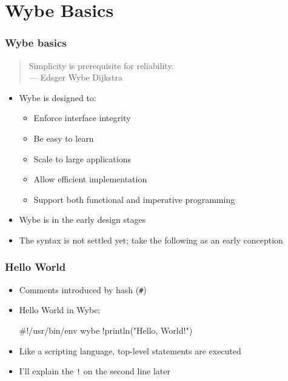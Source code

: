 \documentclass[12pt]{beamer}
\begin{document}
\section{Wybe Basics}

\begin{frame}[fragile]
\frametitle{Wybe basics}
\begin{quotation}
Simplicity is prerequisite for reliability. \\
\hspace*{3em}--- Edsger Wybe Dijkstra
\end{quotation}

\begin{itemize}
\item Wybe is designed to:
  \begin{itemize}
  \item Enforce interface integrity
  \item Be easy to learn
  \item Scale to large applications
  \item Allow efficient implementation
  \item Support both functional and imperative programming
  \end{itemize}
\item Wybe is in the early design stages
\item The syntax is not settled yet; take the following as an early conception
\end{itemize}
\end{frame}


\begin{frame}[fragile]
\frametitle{Hello World}
\begin{itemize}
\item Comments introduced by hash (\texttt{\#})
\item Hello World in Wybe:
\begin{semiverbatim}
    #!/usr/bin/env wybe
    !println("Hello, World!")
\end{semiverbatim}
\item Like a scripting language, top-level statements are executed
\item I'll explain the \texttt{!} on the second line later
\end{itemize}
\end{frame}
\end{document}
